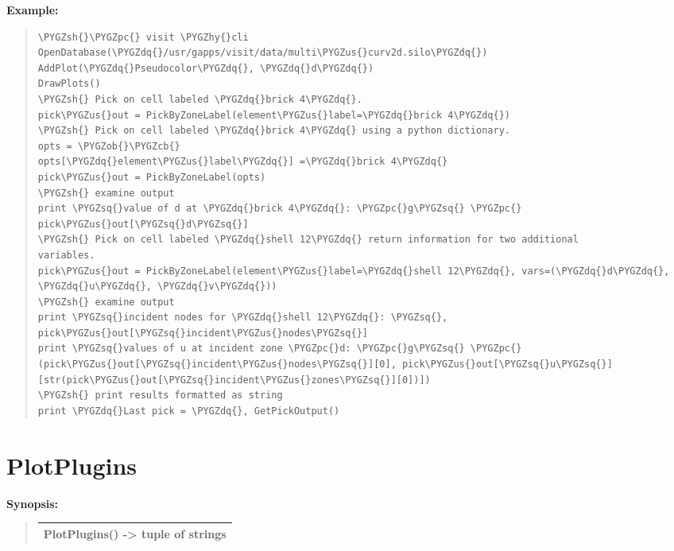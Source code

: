 \documentclass[letterpaper,10pt,english]{sphinxmanual}
\def\PYGZus{\char`\_}
\def\PYGZob{\char`\{}
\def\PYGZcb{\char`\}}
\def\PYGZsh{\char`\#}
\def\PYGZpc{\char`\%}
\def\PYGZhy{\char`\-}
\def\PYGZsq{\char`\'}
\def\PYGZdq{\char`\"}
\renewcommand\PYGZsq{\textquotesingle}
\begin{document}
\begin{DUlineblock}{0em}
\item[] \textbf{Example:}
\item[] 
\end{DUlineblock}
\begin{quote}

\begin{Verbatim}[commandchars=\\\{\}]
\PYGZsh{}\PYGZpc{} visit \PYGZhy{}cli
OpenDatabase(\PYGZdq{}/usr/gapps/visit/data/multi\PYGZus{}curv2d.silo\PYGZdq{})
AddPlot(\PYGZdq{}Pseudocolor\PYGZdq{}, \PYGZdq{}d\PYGZdq{})
DrawPlots()
\PYGZsh{} Pick on cell labeled \PYGZdq{}brick 4\PYGZdq{}.
pick\PYGZus{}out = PickByZoneLabel(element\PYGZus{}label=\PYGZdq{}brick 4\PYGZdq{})
\PYGZsh{} Pick on cell labeled \PYGZdq{}brick 4\PYGZdq{} using a python dictionary.
opts = \PYGZob{}\PYGZcb{}
opts[\PYGZdq{}element\PYGZus{}label\PYGZdq{}] =\PYGZdq{}brick 4\PYGZdq{}
pick\PYGZus{}out = PickByZoneLabel(opts)
\PYGZsh{} examine output
print \PYGZsq{}value of d at \PYGZdq{}brick 4\PYGZdq{}: \PYGZpc{}g\PYGZsq{} \PYGZpc{} pick\PYGZus{}out[\PYGZsq{}d\PYGZsq{}]
\PYGZsh{} Pick on cell labeled \PYGZdq{}shell 12\PYGZdq{} return information for two additional
variables.
pick\PYGZus{}out = PickByZoneLabel(element\PYGZus{}label=\PYGZdq{}shell 12\PYGZdq{}, vars=(\PYGZdq{}d\PYGZdq{}, \PYGZdq{}u\PYGZdq{}, \PYGZdq{}v\PYGZdq{}))
\PYGZsh{} examine output
print \PYGZsq{}incident nodes for \PYGZdq{}shell 12\PYGZdq{}: \PYGZsq{}, pick\PYGZus{}out[\PYGZsq{}incident\PYGZus{}nodes\PYGZsq{}]
print \PYGZsq{}values of u at incident zone \PYGZpc{}d: \PYGZpc{}g\PYGZsq{} \PYGZpc{} (pick\PYGZus{}out[\PYGZsq{}incident\PYGZus{}nodes\PYGZsq{}][0], pick\PYGZus{}out[\PYGZsq{}u\PYGZsq{}][str(pick\PYGZus{}out[\PYGZsq{}incident\PYGZus{}zones\PYGZsq{}][0])])
\PYGZsh{} print results formatted as string
print \PYGZdq{}Last pick = \PYGZdq{}, GetPickOutput()
\end{Verbatim}
\end{quote}


\section{PlotPlugins}
\label{functions:plotplugins}
\begin{DUlineblock}{0em}
\item[] \textbf{Synopsis:}
\end{DUlineblock}
\begin{quote}

\begin{tabulary}{\linewidth}{|L|}
\hline

PlotPlugins() -\textgreater{} tuple of strings
\\
\hline\end{tabulary}

\end{quote}
\end{document}
